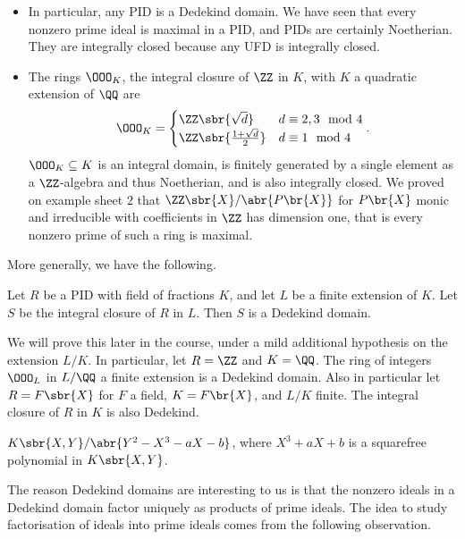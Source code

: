 \begin{example*}
\hfill
\begin{itemize}
\item In particular, any PID is a Dedekind domain. We have seen that every nonzero prime ideal is maximal in a PID, and PIDs are certainly Noetherian. They are integrally closed because any UFD is integrally closed.
\item The rings $ \OOO_K $, the integral closure of $ \ZZ $ in $ K $, with $ K $ a quadratic extension of $ \QQ $ are
$$ \OOO_K =
\begin{cases}
\ZZ\sbr{\sqrt{d}} & d \equiv 2, 3 \mod 4 \\
\ZZ\sbr{\tfrac{1 + \sqrt{d}}{2}} & d \equiv 1 \mod 4
\end{cases}.
$$
$ \OOO_K \subseteq K $ is an integral domain, is finitely generated by a single element as a $ \ZZ $-algebra and thus Noetherian, and is also integrally closed. We proved on example sheet $ 2 $ that $ \ZZ\sbr{X} / \abr{P\br{X}} $ for $ P\br{X} $ monic and irreducible with coefficients in $ \ZZ $ has dimension one, that is every nonzero prime of such a ring is maximal.
\end{itemize}
\end{example*}

More generally, we have the following.

\begin{theorem}
Let $ R $ be a PID with field of fractions $ K $, and let $ L $ be a finite extension of $ K $. Let $ S $ be the integral closure of $ R $ in $ L $. Then $ S $ is a Dedekind domain.
\end{theorem}

We will prove this later in the course, under a mild additional hypothesis on the extension $ L / K $. In particular, let $ R = \ZZ $ and $ K = \QQ $. The ring of integers $ \OOO_L $ in $ L / \QQ $ a finite extension is a Dedekind domain. Also in particular let $ R = F\sbr{X} $ for $ F $ a field, $ K = F\br{X} $, and $ L / K $ finite. The integral closure of $ R $ in $ K $ is also Dedekind.

\begin{example*}
$ K\sbr{X, Y} / \abr{Y^2 - X^3 - aX - b} $, where $ X^3 + aX + b $ is a squarefree polynomial in $ K\sbr{X, Y} $.
\end{example*}

The reason Dedekind domains are interesting to us is that the nonzero ideals in a Dedekind domain factor uniquely as products of prime ideals. The idea to study factorisation of ideals into prime ideals comes from the following observation.


